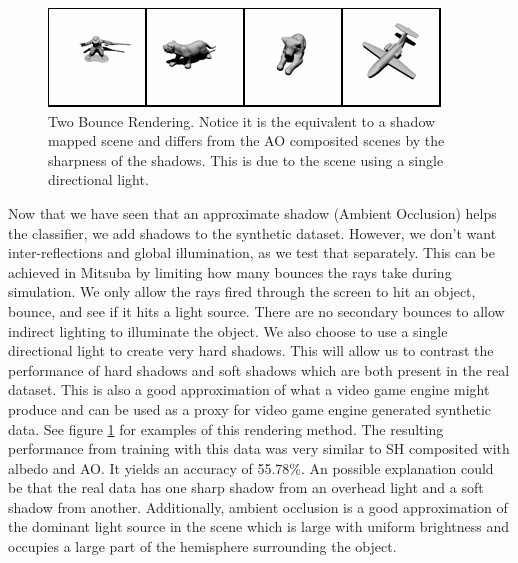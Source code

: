 \documentclass[10pt,twocolumn,letterpaper]{article}
\begin{document}
\begin{figure}[h!]
\centering
\includegraphics[width=1.0\columnwidth]{./assets/2bounce_small.png}
\caption{Two Bounce Rendering.  Notice it is the equivalent to a shadow mapped scene and differs from the AO composited scenes by the sharpness of the shadows. This is due to the scene using a single directional light.}
\label{fig:2BOUNCE}
\end{figure}
Now that we have seen that an approximate shadow (Ambient Occlusion) helps the classifier, we add shadows to the synthetic dataset. However, we don't want inter-reflections and global illumination, as we test that separately.  This can be achieved in Mitsuba by limiting how many bounces the rays take during simulation.  We only allow the rays fired through the screen to hit an object, bounce, and see if it hits a light source.  There are no secondary bounces to allow indirect lighting to illuminate the object. We also choose to use a single directional light to create very hard shadows.  This will allow us to contrast the performance of hard shadows and soft shadows which are both present in the real dataset.  This is also a good approximation of what a video game engine might produce and can be used as a proxy for video game engine generated synthetic data.  See figure \ref{fig:2BOUNCE} for examples of this rendering method.  The resulting performance from training with this data was very similar to SH composited with albedo and AO.  It yields an accuracy of 55.78\%.  An possible explanation could be that the real data has one sharp shadow from an overhead light and a soft shadow from another. Additionally, ambient occlusion is a good approximation of the dominant light source in the scene which is large with uniform brightness and occupies a large part of the hemisphere surrounding the object.


\end{document}
